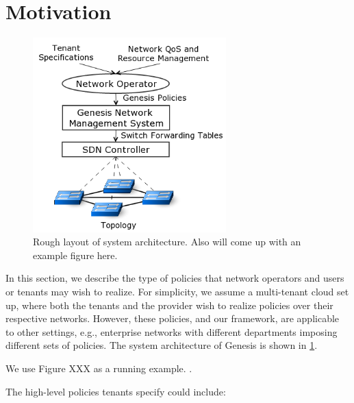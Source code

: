 \section{Motivation}
\begin{figure}
	\includegraphics[height=7.5cm,right]{figures/architecture.png}
	\caption{Rough layout of system architecture. Also will come up with an example figure here.}
	\label{fig:architecture}
\end{figure}
In this section, we describe the type of
policies that network operators and users or tenants may wish to
realize. For simplicity, we assume a multi-tenant cloud set up, where
both the tenants and the provider wish to realize policies over their
respective networks. However, these policies, and our framework, are
applicable to other settings, e.g., enterprise networks with different
departments imposing different sets of policies. The system architecture of 
Genesis is shown in \cref{fig:architecture}.

We use Figure XXX as a running example. .



The high-level policies tenants specify could include:

